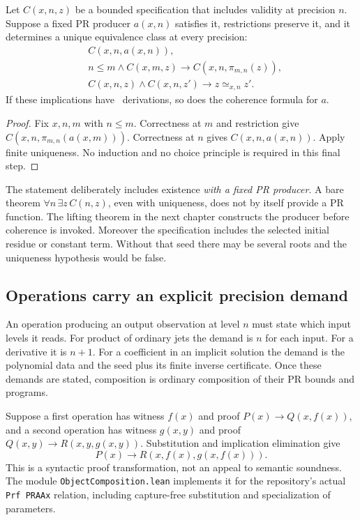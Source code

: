\begin{theorem}
\label{thm:coherence}
Let \(C(x,n,z)\) be a bounded specification that includes validity at
precision \(n\). Suppose a fixed PR producer
\(a(x,n)\) satisfies it, restrictions preserve it, and it determines a
unique equivalence class at every precision:
\begin{align*}
 &C(x,n,a(x,n)),\\
 &n\le m\land C(x,m,z)\to C(x,n,\pi_{m,n}(z)),\\
 &C(x,n,z)\land C(x,n,z')\to z\simeq_{x,n}z'.
\end{align*}
If these implications have \ipra\ derivations, so does the coherence
formula for \(a\).
\end{theorem}
\begin{proof}
Fix \(x,n,m\) with \(n\le m\). Correctness at \(m\) and restriction
give \(C(x,n,\pi_{m,n}(a(x,m)))\). Correctness at \(n\) gives
\(C(x,n,a(x,n))\). Apply finite uniqueness. No induction and no choice
principle is required in this final step.
\end{proof}

The statement deliberately includes existence \emph{with a fixed PR
producer}. A bare theorem \(\forall n\,\exists z\,C(n,z)\), even with
uniqueness, does not by itself provide a PR function. The lifting theorem
in the next chapter constructs the producer before coherence is invoked.
Moreover the specification includes the selected initial residue or
constant term. Without that seed there may be several roots and the
uniqueness hypothesis would be false.

\subsection{Operations carry an explicit precision demand}

An operation producing an output observation at level \(n\) must state
which input levels it reads. For product of ordinary jets the demand is
\(n\) for each input. For a derivative it is \(n+1\). For a coefficient
in an implicit solution the demand is the polynomial data and the seed
plus its finite inverse certificate. Once these demands are stated,
composition is ordinary composition of their PR bounds and programs.

Suppose a first operation has witness \(f(x)\) and proof
\(P(x)\to Q(x,f(x))\), and a second operation has witness \(g(x,y)\)
and proof \(Q(x,y)\to R(x,y,g(x,y))\). Substitution and implication
elimination give
\[
 P(x)\to R(x,f(x),g(x,f(x))).
\]
This is a syntactic proof transformation, not an appeal to semantic
soundness. The module \texttt{ObjectComposition.lean} implements it for
the repository's actual \texttt{Prf PRAAx} relation, including capture-free
substitution and specialization of parameters.

